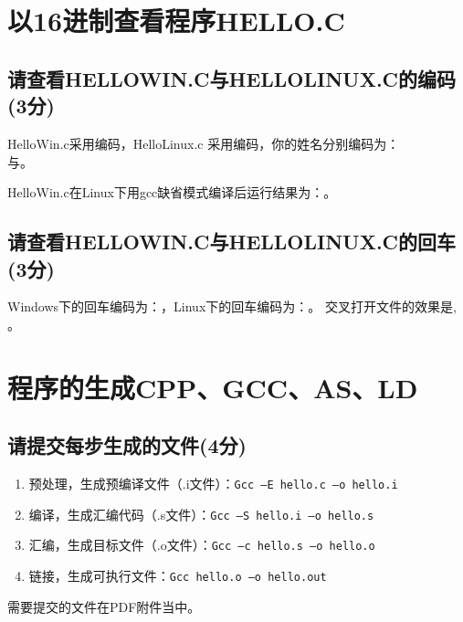 \section{以16进制查看程序HELLO.C}
\subsection{请查看HELLOWIN.C与HELLOLINUX.C的编码(3分)}

HelloWin.c采用编码，HelloLinux.c 采用编码，你的姓名分别编码为：\\
与。

HelloWin.c在Linux下用gcc缺省模式编译后运行结果为：。

\subsection{请查看HELLOWIN.C与HELLOLINUX.C的回车(3分)} 

Windows下的回车编码为：，Linux下的回车编码为：。
交叉打开文件的效果是,
。

 \section{程序的生成CPP、GCC、AS、LD}
\subsection{请提交每步生成的文件(4分)}


\begin{enumerate}
	\item 预处理，生成预编译文件（.i文件）：\lstinline|Gcc –E hello.c –o hello.i|
	\item 编译，生成汇编代码（.s文件）：\lstinline|Gcc –S hello.i –o hello.s|
	\item 汇编，生成目标文件（.o文件）：\lstinline|Gcc –c hello.s –o hello.o|
	\item 链接，生成可执行文件：\lstinline|Gcc hello.o –o hello.out|
\end{enumerate}



需要提交的文件在PDF附件当中。
